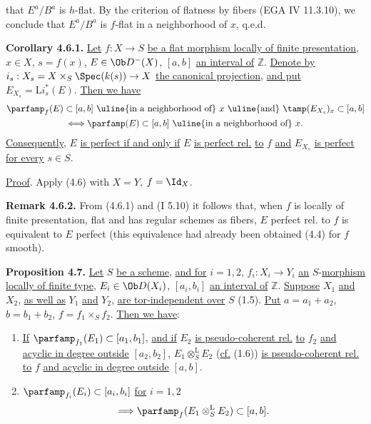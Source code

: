 %
that \(E^a/B^a\) is \(h\)-flat. By the criterion of flatness by fibers (EGA IV 11.3.10), we conclude that \(E^a/B^a\) is \(f\)-flat in a neighborhood of \(x\), q.e.d.

\textbf{Corollary 4.6.1.} \uline{Let} \(f:X\to S\) \uline{be a flat morphism locally of finite presentation}, \(x\in X\), \(s=f(x)\), \(E\in\Ob D^-(X)\), \([a,b]\) \uline{an interval of} \(\mathbb Z\). \uline{Denote by} \(i_s:X_s=X\times_S\Spec(k(s))\to X\) \uline{the canonical projection}, \uline{and put} \(E_{X_s}=\mathrm Li_s^*(E)\). \uline{Then we have}
\[
\begin{gathered}
 \parfamp_f(E)\subset[a,b]\text{ \uline{in a neighborhood of} }x\text{ \uline{and} }\tamp(E_{X_s})_x\subset[a,b]\\
 \Longleftrightarrow \parfamp(E)\subset[a,b]\text{ \uline{in a neighborhood of} }x.
\end{gathered}
\]
\uline{Consequently}, \(E\) \uline{is perfect if and only if} \(E\) \uline{is perfect rel.} \uline{to} \(f\) \uline{and} \(E_{X_s}\) \uline{is perfect for every} \(s\in S\).

\uline{Proof}. Apply (4.6) with \(X=Y\), \(f=\Id_X\).

\textbf{Remark 4.6.2.} From (4.6.1) and (I 5.10) it follows that, when \(f\) is locally of finite presentation, flat and has regular schemes as fibers, \(E\) perfect rel. to \(f\) is equivalent to \(E\) perfect (this equivalence had already been obtained (4.4) for \(f\) smooth).

\textbf{Proposition 4.7.} \uline{Let} \(S\) \uline{be a scheme}, \uline{and for} \(i=1,2\), \(f_i:X_i\to Y_i\) \uline{an} \(S\)-\uline{morphism locally of finite type}, \(E_i\in\Ob D(X_i)\), \([a_i,b_i]\) \uline{an interval of} \(\mathbb Z\). \uline{Suppose} \(X_1\) \uline{and} \(X_2\), \uline{as well as} \(Y_1\) \uline{and} \(Y_2\), \uline{are tor-independent over} \(S\) (1.5). \uline{Put} \(a=a_1+a_2\), \(b=b_1+b_2\), \(f=f_1\times_Sf_2\). \uline{Then we have}:
\begin{enumerate}[label=\alph*)]
\item \uline{If} \(\parfamp_{f_1}(E_1)\subset[a_1,b_1]\), \uline{and if} \(E_2\) \uline{is pseudo-coherent rel.} \uline{to} \(f_2\) \uline{and acyclic in degree outside} \([a_2,b_2]\), \(E_1\otimes_S^{\mathrm L}E_2\) (\uline{cf.} (1.6)) \uline{is pseudo-coherent rel.} \uline{to} \(f\) \uline{and acyclic in degree outside} \([a,b]\).
%
\item \(\parfamp_{f_i}(E_i)\subset[a_i,b_i]\) \uline{for} \(i=1,2\)
\[
 \Longrightarrow\parfamp_f(E_1\otimes_S^{\mathrm L}E_2)\subset[a,b].
\]
\end{enumerate}

